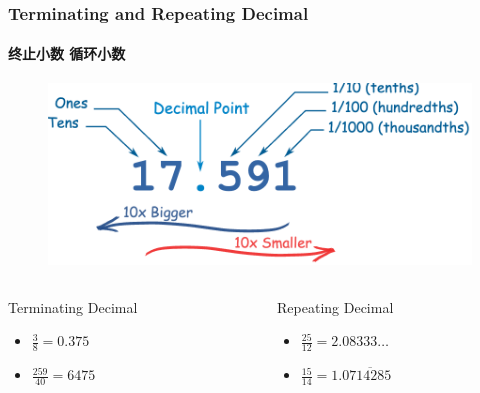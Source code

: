 \documentclass[
	11pt, %
]{beamer}
\begin{document}

\begin{frame}
\frametitle{Terminating and  Repeating Decimal}
\framesubtitle{终止小数 循环小数}

		\begin{figure}
		\includegraphics[width=0.5\linewidth]{Decimal.png}
	  \end{figure}

	  \begin{columns}[t] %
			\begin{column}{0.45\textwidth} %
						\begin{exampleblock}{Terminating Decimal}
								\begin{itemize}
									\item $\frac{3}{8} = 0.375$
									\item $\frac{259}{40} = 6475$
								\end{itemize}							
						\end{exampleblock}
			\end{column}

			\begin{column}{0.5\textwidth} %
			\begin{exampleblock}{Repeating Decimal}
								\begin{itemize}
									\item $\frac{25}{12} = 2.08333 \ldots$
									\item $\frac{15}{14} = 1.0\overline{714285}$
								\end{itemize}	
			\end{exampleblock}
			\end{column}
	\end{columns}
\end{frame}

\end{document}
